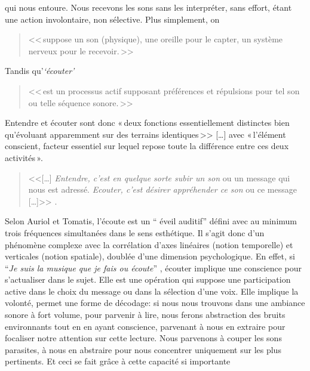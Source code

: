 qui nous entoure. Nous recevons les sons sans les interpréter, sans
effort, étant une action involontaire, non
sélective. Plus simplement, on
\begin{quote}
	<<\,suppose un son (physique), une oreille
	pour le capter, un système nerveux pour le recevoir.\,>>\autocite[2]{auriol:cle}
 \end{quote}
 Tandis qu'\textit{`écouter'}
\begin{quote}
	<<\,est un
	processus actif supposant préférences et répulsions pour tel son ou
	telle séquence sonore.\,>>\autocite[2]{auriol:cle}

\end{quote}
Entendre et écouter sont donc  «\,deux
fonctions essentiellement distinctes bien qu'évoluant apparemment sur
des terrains iden\-ti\-ques\,>>
[\dots] avec «\,l'é\-lé\-ment cons\-cient, facteur essentiel sur lequel repose toute la
différence entre ces deux activités\,». \autocite[122]{tomatis_oreille_1987}
\begin{quote}

	<<[\ldots] \emph{Entendre, c'est en quelque sorte subir
		un son} ou un message qui nous est adressé. \emph{Ecouter, c'est désirer appréhender ce son} ou ce message [\ldots]>>
	\autocite [p. 111]{tomatis:education}.
\end{quote}
Selon Auriol %
 et Tomatis, l'écoute est un `` éveil auditif''  défini avec au
minimum trois
fréquences simultanées dans le sens esthétique. %
Il s'agit donc d'un phénomène
complexe avec la corrélation d'axes
linéaires (notion temporelle) et verticales (notion spatiale), doublée d'une
dimension psychologique.
En effet, si \enquote{\emph{Je suis la musique que je fais ou écoute}}
\autocite [8]{viret:b}, écouter implique une conscience pour s'actualiser dans le sujet.
Elle est une opération
qui suppose une participation active dans le choix du message
ou dans la sélection d'une voix. Elle  implique la volonté,
permet une forme de décodage:
si nous nous trouvons dans une ambiance sonore à fort volume, pour
parvenir à lire, nous
ferons abstraction des bruits environnants tout en en ayant
conscience, parvenant à nous en extraire pour focaliser notre
attention sur cette lecture. Nous parvenons à couper les sons parasites, à nous en abstraire pour
nous concentrer uniquement sur les plus  pertinents. Et ceci se fait grâce à cette capacité si importante
